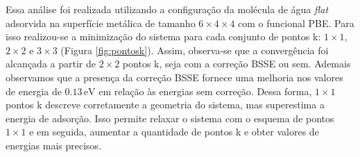 Essa análise foi realizada utilizando a configuração da molécula de água \textit{flat} adsorvida na superfície metálica de tamanho $ 6\times4\times4 $ com o funcional PBE. Para isso realizou-se a minimização do sistema para cada conjunto de pontos k: $1\times1$, $2\times2$ e $3\times3$ (Figura \ref{fig:pontosk}). Assim, observa-se que a convergência foi alcançada a partir de $ 2\times2 $ pontos k, seja com a correção BSSE ou sem. Ademais observamos que a presença da correção BSSE fornece uma melhoria nos valores de energia de $ 0.13 \,\si{\eV} $ em relação às energias sem correção. Dessa forma, $1\times1$ pontos k descreve corretamente a geometria do sistema, mas superestima a energia de adsorção. Isso permite relaxar o sistema com o esquema de pontos $1\times1$ e em seguida, aumentar a quantidade de pontos k e obter valores de energias mais precisos.%
 

